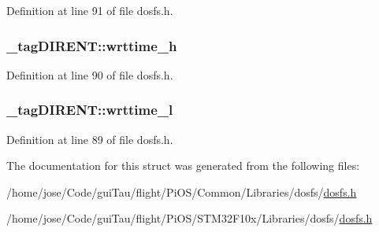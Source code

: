 Definition at line 91 of file dosfs.\-h.

\hypertarget{struct__tag_d_i_r_e_n_t_a0070e26a98c091bf05cac0169864c40b}{
\subsubsection[{wrttime\-\_\-h}]{ \-\_\-tag\-D\-I\-R\-E\-N\-T\-::wrttime\-\_\-h}}\label{struct__tag_d_i_r_e_n_t_a0070e26a98c091bf05cac0169864c40b}


Definition at line 90 of file dosfs.\-h.

\hypertarget{struct__tag_d_i_r_e_n_t_a55e29865ff62a0f7820636ccfd525ab9}{
\subsubsection[{wrttime\-\_\-l}]{ \-\_\-tag\-D\-I\-R\-E\-N\-T\-::wrttime\-\_\-l}}\label{struct__tag_d_i_r_e_n_t_a55e29865ff62a0f7820636ccfd525ab9}


Definition at line 89 of file dosfs.\-h.



The documentation for this struct was generated from the following files\-:\begin{DoxyCompactItemize}
\item 
/home/jose/\-Code/gui\-Tau/flight/\-Pi\-O\-S/\-Common/\-Libraries/dosfs/\hyperlink{_common_2_libraries_2dosfs_2dosfs_8h}{dosfs.\-h}\item 
/home/jose/\-Code/gui\-Tau/flight/\-Pi\-O\-S/\-S\-T\-M32\-F10x/\-Libraries/dosfs/\hyperlink{_s_t_m32_f10x_2_libraries_2dosfs_2dosfs_8h}{dosfs.\-h}\end{DoxyCompactItemize}
